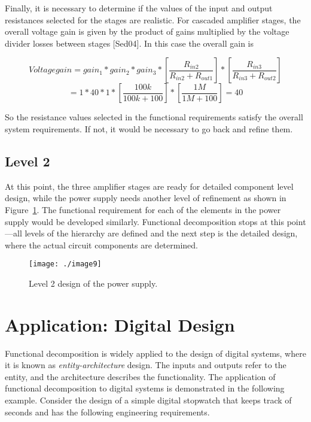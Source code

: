 Finally, it is necessary to determine if the values of the input and
output resistances selected for the stages are realistic. For cascaded
amplifier stages, the overall voltage gain is given by the product of
gains multiplied by the voltage divider losses between stages
{[}Sed04{]}. In this case the overall gain is

$$Voltage gain = gain_1 * gain_2 * gain_3*\left[ \frac {R_{in2}} {R_{in2}+R_{out1}} \right]  * \left[ \frac{R_{in3}} {R_{in3}+R_{out2}} \right] $$
$$= 1 * 40 * 1*\left[ \frac{100k}{100k+100} \right] * \left[ \frac{1M}{1M+100} \right] = 40$$

So the resistance values selected in the functional requirements satisfy
the overall system requirements. If not, it would be necessary to go
back and refine them.

\subsection*{Level 2}
\label{subsection:level-2}

At this point, the three amplifier stages are ready for detailed
component level design, while the power supply needs another level of
refinement as shown in Figure~\ref{figure:level2PowerSupply}. 
The functional requirement for each
of the elements in the power supply would be developed similarly.
Functional decomposition stops at this point---all levels of the
hierarchy are defined and the next step is the detailed design, where
the actual circuit components are determined.

\begin{figure}[h]
\centering
\texttt{[image: ./image9]}
\caption{Level 2 design of the power supply.}
\label{figure:level2PowerSupply}
\end{figure}

\section{Application: Digital Design}
\label{section:application-digital-design}

Functional decomposition is widely applied to the design of digital
systems, where it is known as \emph{entity-architecture} design. The
inputs and outputs refer to the entity, and the architecture describes
the functionality. The application of functional decomposition to
digital systems is demonstrated in the following example. Consider the
design of a simple digital stopwatch that keeps track of seconds and has
the following engineering requirements.


